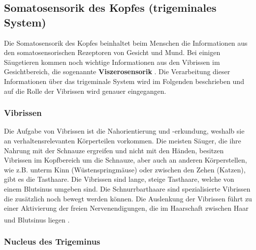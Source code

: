 \documentclass[12pt,a4paper,pdftex]{article}
\begin{document}
\newpage
\subsection{Somatosensorik des Kopfes (trigeminales System) }
\label{sec:somatokopf}
Die Somatosensorik des Kopfes beinhaltet beim Menschen die Informationen aus den somatosensorischen Rezeptoren von Gesicht und Mund. Bei einigen Säugetieren kommen noch wichtige Informationen aus den Vibrissen im Gesichtbereich, die sogenannte \textbf{Viszerosensorik} . Die Verarbeitung dieser Informationen über das trigeminale System wird im Folgenden beschrieben und auf die Rolle der Vibrissen wird genauer eingegangen.

\subsubsection*{Vibrissen}
Die Aufgabe von Vibrissen ist die Nahorientierung und -erkundung, weshalb sie an verhaltensrelevanten Körperteilen vorkommen. Die meisten Säuger, die ihre Nahrung mit der Schnauze ergreifen und nicht mit den Händen, besitzen Vibrissen im Kopfbereich um die Schnauze, aber auch an anderen Körperstellen, wie z.B. unterm Kinn (Wüstenspringmäuse) oder zwischen den Zehen (Katzen), gibt es die Tasthaare. Die Vibrissen sind lange, steige Tasthaare, welche von einem Blutsinus umgeben sind. Die Schnurrbarthaare  sind spezialisierte Vibrissen die zusätzlich noch bewegt werden können. 
Die Auslenkung der Vibrissen führt zu einer Aktivierung der freien Nervenendigungen, die im Haarschaft zwischen Haar und Blutsinus liegen \textsuperscript{\cite[5]{heldmaier2003tierphysiologie}}.

\subsubsection*{Nucleus des Trigeminus}
\end{document}
